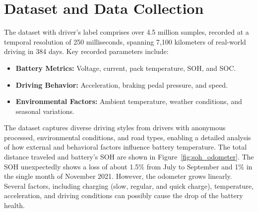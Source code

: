 \section{Dataset and Data Collection}

The dataset with driver's label comprises over 4.5 million samples, recorded at a temporal resolution of 250 milliseconds, spanning 7,100 kilometers of real-world driving in 384 days. 
Key recorded parameters include:

\begin{itemize}
    \item \textbf{Battery Metrics:} Voltage, current, pack temperature, \gls{SOH}, and \gls{SOC}.
    \item \textbf{Driving Behavior:} Acceleration, braking pedal pressure, and speed.
    \item \textbf{Environmental Factors:} Ambient temperature, weather conditions, and seasonal variations.
\end{itemize}

The dataset captures diverse driving styles from drivers with anonymous processed, environmental conditions, and road types, enabling a detailed analysis of how external and behavioral factors influence battery temperature.
The total distance traveled and battery's \gls{SOH} are shown in Figure~\ref{fig:soh_odometer}. 
The \gls{SOH} unexpectedly shows a loss of about 1.5\% from July to September and 1\% in the single month of November 2021. 
However, the odometer grows linearly. 
Several factors, including charging (slow, regular, and quick charge), temperature, acceleration, and driving conditions can possibly cause the drop of the battery health. 

